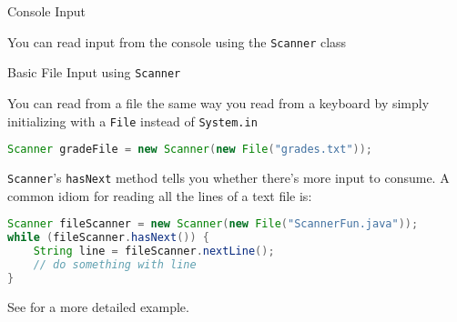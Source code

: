 \documentclass{beamer}
\begin{document}
\begin{frame}[fragile]{Console Input}


You can read input from the console using the {\tt Scanner} class
\end{frame}

\begin{frame}[fragile]{Basic File Input using {\tt Scanner}}


You can read from a file the same way you read from a keyboard by simply initializing with a {\tt File} instead of {\tt System.in}
\begin{lstlisting}[language=Java]
Scanner gradeFile = new Scanner(new File("grades.txt"));
\end{lstlisting}
{\tt Scanner}'s {\tt hasNext} method tells you whether there's more input to consume.  A common idiom for reading all the lines of a text file is:
\begin{lstlisting}[language=Java]
Scanner fileScanner = new Scanner(new File("ScannerFun.java"));
while (fileScanner.hasNext()) {
    String line = fileScanner.nextLine();
    // do something with line
}

\end{lstlisting}

See  for a more detailed example.
\end{frame}
\end{document}
